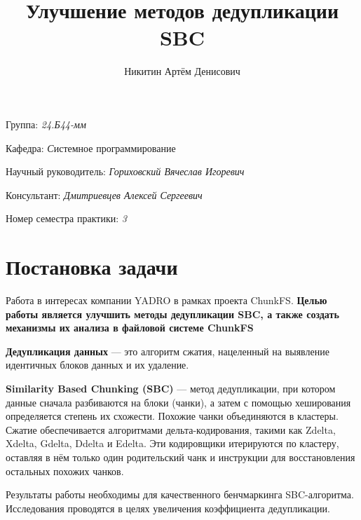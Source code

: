 \documentclass[a4paper]{article}
\title{Улучшение методов дедупликации SBC}
\author{Никитин Артём Денисович}
\date{}
\begin{document}
\maketitle

\begin{flushright}
    Группа: \emph{24.Б44-мм}

    Кафедра: \emph Системное программирование

    Научный руководитель: \emph{Гориховский Вячеслав Игоревич}

    Консультант: \emph{Дмитриевцев Алексей Сергеевич}
    
    Номер семестра практики: \emph{3}
\end{flushright} 


\section{Постановка задачи}

Работа в интересах компании YADRO в рамках проекта ChunkFS. \textbf{Целью работы является улучшить методы дедупликации SBC, а также создать механизмы их анализа в файловой системе ChunkFS}

\textbf{Дедупликация данных} — это алгоритм сжатия, нацеленный на выявление
идентичных блоков данных и их удаление.

\textbf{Similarity Based Chunking (SBC)} — метод дедупликации, при
котором данные сначала разбиваются на блоки (чанки), а затем с помощью
хеширования определяется степень их схожести. Похожие чанки объединяются
в кластеры. Сжатие обеспечивается алгоритмами дельта-кодирования, такими
как Zdelta, Xdelta, Gdelta, Ddelta и Edelta. Эти кодировщики итерируются по
кластеру, оставляя в нём только один родительский чанк и инструкции для
восстановления остальных похожих чанков.

Результаты работы необходимы для качественного бенчмаркинга SBC-алгоритма. Исследования проводятся в целях увеличения коэффициента дедупликации.
\end{document}
